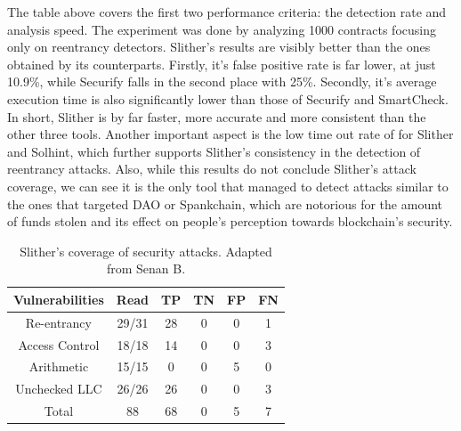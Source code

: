 The table above covers the first two performance criteria: the detection rate and analysis speed. The experiment was done by analyzing 1000 contracts focusing only on reentrancy detectors. Slither's results are visibly better than the ones obtained by its counterparts. Firstly, it's false positive rate is far lower, at just 10.9\%, while Securify falls in the second place with 25\%. Secondly, it's average execution time is also significantly lower than those of Securify and SmartCheck. In short, Slither is by far faster, more accurate and more consistent than the other three tools. Another important aspect is the low time out rate of for Slither and Solhint, which further supports Slither's consistency in the detection of reentrancy attacks. Also, while this results do not conclude Slither's attack coverage, we can see it is the only tool that managed to detect attacks similar to the ones that targeted DAO or Spankchain, which are notorious for the amount of funds stolen and its effect on people's perception towards blockchain's security.

\begin{table}[h]
\centering
\begin{tabular}{|cccccc|}
\hline
\multicolumn{1}{|c|}{Vulnerabilities} & \multicolumn{1}{c|}{Read} & \multicolumn{1}{c|}{TP} & \multicolumn{1}{c|}{TN} & \multicolumn{1}{c|}{FP} & FN \\ \hline
\multicolumn{1}{|c|}{Re-entrancy}     & 29/31                     & 28                      & 0                       & 0                       & 1  \\
\multicolumn{1}{|c|}{Access Control}  & 18/18                     & 14                      & 0                       & 0                       & 3  \\
\multicolumn{1}{|c|}{Arithmetic}      & 15/15                     & 0                       & 0                       & 5                       & 0  \\
\multicolumn{1}{|c|}{Unchecked LLC}   & 26/26                     & 26                      & 0                       & 0                       & 3  \\ \hline
Total                                 & 88                        & 68                      & 0                       & 5                       & 7  \\ \hline
\end{tabular}
\caption{Slither's coverage of security attacks. Adapted from Senan B.  \cite{staticAnalysisTest}}
\label{tab:my-table1}
\end{table}

